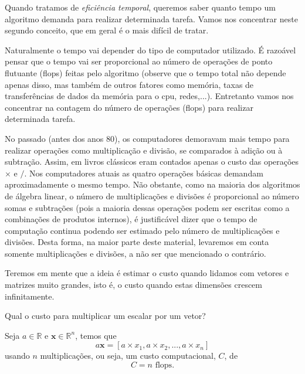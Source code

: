 Quando tratamos de \emph{eficiência temporal}, queremos saber quanto tempo um algoritmo demanda para realizar determinada tarefa. Vamos nos concentrar neste segundo conceito, que em geral é o mais difícil de tratar.

Naturalmente o tempo vai depender do tipo de computador utilizado. É razoável pensar que o tempo vai ser proporcional ao número de operações de ponto flutuante (flops) feitas pelo algoritmo (observe que o tempo total não depende apenas disso, mas também de outros fatores como memória, taxas de transferências de dados da memória para o cpu, redes,...). Entretanto vamos nos concentrar na contagem do número de operações (flops) para realizar determinada tarefa.

No passado (antes dos anos 80), os computadores demoravam mais tempo para realizar operações como multiplicação e divisão, se comparados à adição ou à subtração. Assim, em livros clássicos eram contados apenas o custo das operações $\times$ e $/$. Nos computadores atuais as quatro operações básicas demandam aproximadamente o mesmo tempo. Não obstante, como na maioria dos algoritmos de álgebra linear, o número de multiplicações e divisões é proporcional ao número somas e subtrações (pois a maioria dessas operações podem ser escritas como a combinações de produtos internos), é justificável dizer que o tempo de computação continua podendo ser estimado pelo número de multiplicações e divisões. Desta forma, na maior parte deste material, levaremos em conta somente multiplicações e divisões, a não ser que mencionado o contrário.

Teremos em mente que a ideia é estimar o custo quando lidamos com vetores e matrizes muito grandes, isto é, o custo quando estas dimensões crescem infinitamente.

\begin{ex}
Qual o custo para multiplicar um escalar por um vetor?
\end{ex}
\begin{sol}
Seja $a \in \mathbb{R}$ e $\pmb{x} \in \mathbb{R}^n$, temos que
\begin{equation}
  a \pmb{x} = [a\times x_1 , a\times x_2 , ... ,a\times x_n]
\end{equation}
usando $n$ multiplicações, ou seja, um custo computacional, $C$, de
\begin{equation}
  C = n \text{~flops}.
\end{equation}
\end{sol}


